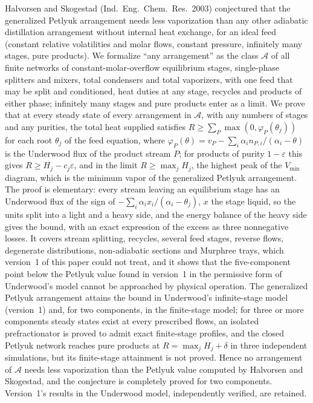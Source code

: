 \documentclass[11pt,a4paper]{report}
\begin{document}
\makepapertitle

\begin{paperabstract}
Halvorsen and Skogestad (Ind.\ Eng.\ Chem.\ Res.\ 2003) conjectured that the generalized Petlyuk arrangement needs less
vaporization than any other adiabatic distillation arrangement without internal heat exchange, for an ideal feed
(constant relative volatilities and molar flows, constant pressure, infinitely many stages, pure products). We
formalize ``any arrangement'' as the class $\mathcal A$ of all finite networks of constant-molar-overflow equilibrium stages,
single-phase splitters and mixers, total condensers and total vaporizers, with one feed that may be split and
conditioned, heat duties at any stage, recycles and products of either phase; infinitely many stages and pure products
enter as a limit. We prove that at every steady state of every arrangement in $\mathcal A$, with any numbers of stages and
any purities, the total heat supplied satisfies $R\ge\sum_P\max(0,\varphi_P(\theta_j))$ for each root $\theta_j$ of the feed
equation, where $\varphi_P(\theta)=v_P-\sum_i\alpha_in_{P,i}/(\alpha_i-\theta)$ is the Underwood flux of the product stream $P$; for
products of purity $1-\varepsilon$ this gives $R\ge H_j-c_j\varepsilon$, and in the limit $R\ge\max_jH_j$, the highest peak of the
$V_{\min}$ diagram, which is the minimum vapor of the generalized Petlyuk arrangement. The proof is elementary: every
stream leaving an equilibrium stage has an Underwood flux of the sign of $-\sum_i\alpha_ix_i/(\alpha_i-\theta_j)$, $x$ the stage
liquid, so the units split into a light and a heavy side, and the energy balance of the heavy side gives the bound,
with an exact expression of the excess as three nonnegative losses. It covers stream splitting, recycles, several feed
stages, reverse flows, degenerate distributions, non-adiabatic sections and Murphree trays, which version~1 of this
paper could not treat, and it shows that the five-component point below the Petlyuk value found in version~1 in the
permissive form of Underwood's model cannot be approached by physical operation. The generalized Petlyuk arrangement
attains the bound in Underwood's infinite-stage model (version~1) and, for two components, in the finite-stage model;
for three or more components steady states exist at every prescribed flows, an isolated prefractionator is proved to
admit exact finite-stage profiles, and the closed Petlyuk network reaches pure products at $R=\max_jH_j+\delta$ in three
independent simulations, but its finite-stage attainment is not proved. Hence no arrangement of $\mathcal A$ needs less
vaporization than the Petlyuk value computed by Halvorsen and Skogestad, and the conjecture is completely proved for two
components. Version~1's results in the Underwood model, independently verified, are retained.
\end{paperabstract}
\end{document}
